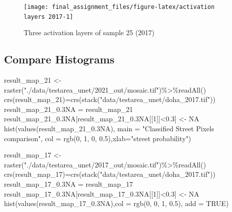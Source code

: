 \documentclass[
]{article}
\newenvironment{Shaded}{\begin{snugshade}}{\end{snugshade}}
\newcommand{\AttributeTok}[1]{\textcolor[rgb]{0.77,0.63,0.00}{#1}}
\newcommand{\ConstantTok}[1]{\textcolor[rgb]{0.00,0.00,0.00}{#1}}
\newcommand{\DecValTok}[1]{\textcolor[rgb]{0.00,0.00,0.81}{#1}}
\newcommand{\FloatTok}[1]{\textcolor[rgb]{0.00,0.00,0.81}{#1}}
\newcommand{\FunctionTok}[1]{\textcolor[rgb]{0.00,0.00,0.00}{#1}}
\newcommand{\NormalTok}[1]{#1}
\newcommand{\OtherTok}[1]{\textcolor[rgb]{0.56,0.35,0.01}{#1}}
\newcommand{\SpecialCharTok}[1]{\textcolor[rgb]{0.00,0.00,0.00}{#1}}
\newcommand{\StringTok}[1]{\textcolor[rgb]{0.31,0.60,0.02}{#1}}
\begin{document}
\begin{figure}

{\centering \texttt{[image: final\_assignment\_files/figure-latex/activation layers 2017-1]} 

}

\caption{Three activation layers of sample 25 (2017)}\label{fig:activation layers 2017}
\end{figure}

\hypertarget{compare-histograms}{%
\subsection{Compare Histograms}\label{compare-histograms}}

\begin{Shaded}
\begin{Highlighting}[]
\NormalTok{result\_map\_21 }\OtherTok{\textless{}{-}} \FunctionTok{raster}\NormalTok{(}\StringTok{"./data/testarea\_unet/2021\_out/mosaic.tif"}\NormalTok{)}\SpecialCharTok{\%\textgreater{}\%}\FunctionTok{readAll}\NormalTok{()}
\FunctionTok{crs}\NormalTok{(result\_map\_21)}\OtherTok{=}\FunctionTok{crs}\NormalTok{(}\FunctionTok{stack}\NormalTok{(}\StringTok{"data/testarea\_unet/doha\_2017.tif"}\NormalTok{))}
\NormalTok{result\_map\_21\_0}\FloatTok{.3}\NormalTok{NA }\OtherTok{=}\NormalTok{ result\_map\_21}
\NormalTok{result\_map\_21\_0}\FloatTok{.3}\NormalTok{NA[result\_map\_21\_0}\FloatTok{.3}\NormalTok{NA[[}\DecValTok{1}\NormalTok{]]}\SpecialCharTok{\textless{}}\FloatTok{0.3}\NormalTok{] }\OtherTok{\textless{}{-}} \ConstantTok{NA}
\FunctionTok{hist}\NormalTok{(}\FunctionTok{values}\NormalTok{(result\_map\_21\_0}\FloatTok{.3}\NormalTok{NA), }\AttributeTok{main =} \StringTok{"Classified Street Pixels comparison"}\NormalTok{,}
     \AttributeTok{col =} \FunctionTok{rgb}\NormalTok{(}\DecValTok{0}\NormalTok{, }\DecValTok{1}\NormalTok{, }\DecValTok{0}\NormalTok{, }\FloatTok{0.5}\NormalTok{),}\AttributeTok{xlab=}\StringTok{"street probability"}\NormalTok{)}

\NormalTok{result\_map\_17 }\OtherTok{\textless{}{-}} \FunctionTok{raster}\NormalTok{(}\StringTok{"./data/testarea\_unet/2017\_out/mosaic.tif"}\NormalTok{)}\SpecialCharTok{\%\textgreater{}\%}\FunctionTok{readAll}\NormalTok{()}
\FunctionTok{crs}\NormalTok{(result\_map\_17)}\OtherTok{=}\FunctionTok{crs}\NormalTok{(}\FunctionTok{stack}\NormalTok{(}\StringTok{"data/testarea\_unet/doha\_2017.tif"}\NormalTok{))}
\NormalTok{result\_map\_17\_0}\FloatTok{.3}\NormalTok{NA }\OtherTok{=}\NormalTok{ result\_map\_17}
\NormalTok{result\_map\_17\_0}\FloatTok{.3}\NormalTok{NA[result\_map\_17\_0}\FloatTok{.3}\NormalTok{NA[[}\DecValTok{1}\NormalTok{]]}\SpecialCharTok{\textless{}}\FloatTok{0.3}\NormalTok{] }\OtherTok{\textless{}{-}} \ConstantTok{NA}
\FunctionTok{hist}\NormalTok{(}\FunctionTok{values}\NormalTok{(result\_map\_17\_0}\FloatTok{.3}\NormalTok{NA),}\AttributeTok{col =} \FunctionTok{rgb}\NormalTok{(}\DecValTok{0}\NormalTok{, }\DecValTok{0}\NormalTok{, }\DecValTok{1}\NormalTok{, }\FloatTok{0.5}\NormalTok{), }\AttributeTok{add =} \ConstantTok{TRUE}\NormalTok{)}


\end{Highlighting}
\end{Shaded}
\end{document}
